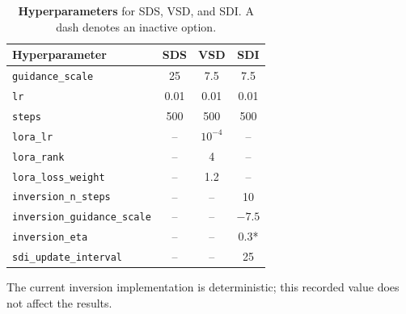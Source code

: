 \begin{table}[t]
  \centering
  \footnotesize
  \caption{\textbf{Hyperparameters} for SDS, VSD, and SDI. A dash denotes an inactive option.}
  \label{tab:hparams}
  \begin{tabular}{@{}lccc@{}}
    \toprule
    Hyperparameter & SDS & VSD & SDI \\
    \midrule
    \texttt{guidance\_scale} & 25 & 7.5 & 7.5 \\
    \texttt{lr} & 0.01 & 0.01 & 0.01 \\
    \texttt{steps} & 500 & 500 & 500 \\
    \midrule
    \texttt{lora\_lr} & -- & $10^{-4}$ & -- \\
    \texttt{lora\_rank} & -- & 4 & -- \\
    \texttt{lora\_loss\_weight} & -- & 1.2 & -- \\
    \midrule
    \texttt{inversion\_n\_steps} & -- & -- & 10 \\
    \texttt{inversion\_guidance\_scale} & -- & -- & $-7.5$ \\
    \texttt{inversion\_eta} & -- & -- & 0.3* \\
    \texttt{sdi\_update\_interval} & -- & -- & 25 \\
    \bottomrule
  \end{tabular}
  \par\smallskip\raggedright *The current inversion implementation is deterministic; this recorded value does not affect the results.
\end{table}
